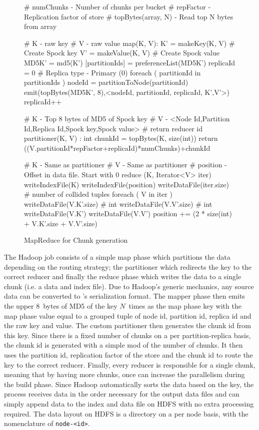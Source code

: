 \begin{figure}
\centering

\scriptsize
\begin{verbatimtab}
# numChunks - Number of chunks per bucket
# repFactor - Replication factor of store
# topBytes(array, N) - Read top N bytes from array

# K - raw key
# V - raw value
map(K, V):
  K' = makeKey(K, V)     	# Create Spock key
  V' = makeValue(K, V)   	# Create Spock value
  MD5K' = md5(K')
  [partitionIds] = preferenceList(MD5K')
  replicaId = 0			# Replica type - Primary (0)
  foreach ( partitionId in partitionIds )
    nodeId = partitionToNode(partitionId)
    emit(topBytes(MD5K', 8),<nodeId, partitionId, replicaId, K',V'>) 
    replicaId++     

# K - Top 8 bytes of MD5 of Spock key
# V - <Node Id,Partition Id,Replica Id,Spock key,Spock value>
# return reducer id
partitioner(K, V) : int
  chunkId = topBytes(K, size(int)) %
  return ((V.partitionId*repFactor+replicaId)*numChunks)+chunkId
 
# K - Same as partitioner
# V - Same as partitioner
# position - Offset in data file. Start with 0
reduce (K, Iterator<V> iter)
  writeIndexFile(K)
  writeIndexFile(position)
  writeDataFile(iter.size)   # number of collided tuples
  foreach ( V in iter )
    writeDataFile(V.K'.size) # int
    writeDataFile(V.V'.size) # int
    writeDataFile(V.K')
    writeDataFile(V.V')
    position += (2 * size(int) + V.K'.size + V.V'.size)
\end{verbatimtab}
\caption{MapReduce for Chunk generation}
\label{fig:mapreduce-chunk-generation}
\end{figure}

The Hadoop job consists of a simple map phase which partitions the
data depending on the routing strategy; the partitioner which redirects
the key to the correct reducer and finally the reduce phase which writes 
the data to a single chunk (i.e. a data and index file). Due to Hadoop's generic
 mechanics, any source data can be converted to
\projectname{}'s serialization format. The mapper phase then emits the 
upper 8~bytes of MD5 of the \projectname{} key $N$~times as the map phase 
key with the map phase value equal to a grouped tuple of node id, partition id, replica id
and the raw \projectname{} key and value. The custom partitioner then
generates the chunk id from this key. Since there is a fixed number of
chunks on a per partition-replica basis, the chunk id is generated
with a simple mod of the number of chunks. It then uses the
partition id, replication factor of the store and the chunk id to
route the key to the correct reducer. Finally, every reducer is
responsible for a single chunk, meaning that by having more chunks,
once can increase the parallelism during the build phase. Since Hadoop
automatically sorts the data based on the key, the process receives
data in the order necessary for the output data files and can simply
append data to the index and data file on HDFS with no extra processing
required. The data layout on HDFS is a directory on a per \projectname{}
node basis, with the nomenclature of \verb=node-<id>=.

